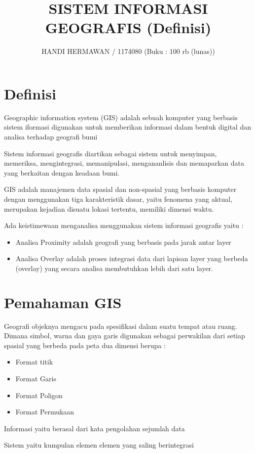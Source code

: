 \title{SISTEM INFORMASI GEOGRAFIS (Definisi)}
\author{HANDI HERMAWAN / 1174080 (Buku : 100 rb (lunas))}


\maketitle

\section{Definisi}
	\item Geographic information system (GIS) adalah sebuah komputer yang berbasis sistem iformasi digunakan untuk memberikan informasi dalam bentuk digital dan analisa terhadap geografi bumi
	\item Sistem informasi geografis diartikan sebagai sistem untuk menyimpan, memeriksa, mengintegrasi, memanipulasi, mengananlisis dan memaparkan data yang berkaitan dengan keadaan bumi.
	\item GIS adalah manajemen data spasial dan non-spasial yang berbasis komputer dengan menggunakan  tiga karakteristik dasar, yaitu fenomena yang aktual, merupakan kejadian disuatu lokasi tertentu, memiliki dimensi waktu.
	
	\item Ada keistimewaan menganalisa menggunakan sistem informasi geografis yaitu :

	\begin{itemize}
	\item Analisa Proximity adalah geografi yang berbasis pada jarak antar layer
	\item Analisa Overlay adalah proses integrasi data dari lapisan layer yang berbeda (overlay) yang secara analisa membutuhkan lebih dari satu layer.
    \end{itemize}
    
\section{Pemahaman GIS}
    \item Geografi objeknya mengacu pada spesifikasi dalam suatu tempat atau ruang. Dimana simbol, warna dan gaya garis digunakan sebagai perwakilan dari setiap spasial yang berbeda pada peta dua dimensi berupa :
    \begin{itemize}
	\item Format titik
	\item Format Garis 
	\item Format Poligon 
	\item Format Permukaan
    \end{itemize}
    \item Informasi yaitu berasal dari kata pengolahan sejumlah data 
    \item Sistem yaitu kumpulan elemen elemen yang saling berintegrasi 
    

